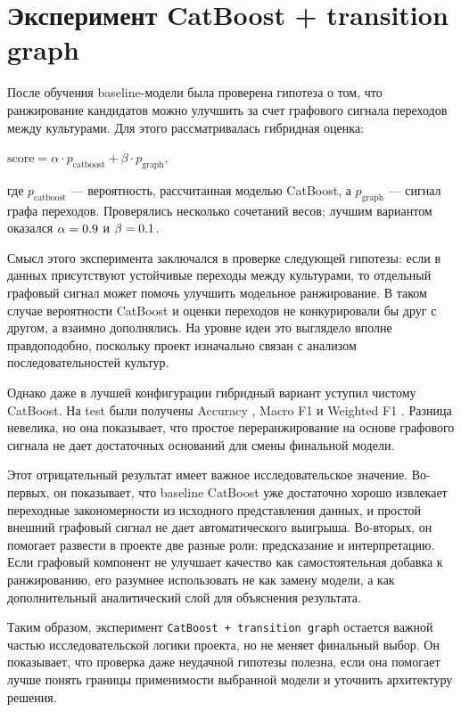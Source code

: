 

\section{Эксперимент CatBoost + transition graph}

После обучения baseline-модели была проверена гипотеза о том, что ранжирование кандидатов можно улучшить за счет графового сигнала переходов между культурами. Для этого рассматривалась гибридная оценка:
\begin{center}
\(
\mathrm{score}=\alpha \cdot p_{\mathrm{catboost}}+\beta \cdot p_{\mathrm{graph}},
\)
\end{center}

где $p_{\mathrm{catboost}}$ --- вероятность, рассчитанная моделью CatBoost, а $p_{\mathrm{graph}}$ --- сигнал графа переходов. Проверялись несколько сочетаний весов; лучшим вариантом оказался $\alpha=0.9$ и $\beta=0.1$.

Смысл этого эксперимента заключался в проверке следующей гипотезы: если в данных присутствуют устойчивые переходы между культурами, то отдельный графовый сигнал может помочь улучшить модельное ранжирование. В таком случае вероятности CatBoost и оценки переходов не конкурировали бы друг с другом, а взаимно дополнялись. На уровне идеи это выглядело вполне правдоподобно, поскольку проект изначально связан с анализом последовательностей культур.

Однако даже в лучшей конфигурации гибридный вариант уступил чистому CatBoost. На test были получены Accuracy \GraphAcc{}, Macro F1 \GraphMacroFOne{} и Weighted F1 \GraphWeightedFOne{}. Разница невелика, но она показывает, что простое переранжирование на основе графового сигнала не дает достаточных оснований для смены финальной модели.

Этот отрицательный результат имеет важное исследовательское значение. Во-первых, он показывает, что baseline CatBoost уже достаточно хорошо извлекает переходные закономерности из исходного представления данных, и простой внешний графовый сигнал не дает автоматического выигрыша. Во-вторых, он помогает развести в проекте две разные роли: предсказание и интерпретацию. Если графовый компонент не улучшает качество как самостоятельная добавка к ранжированию, его разумнее использовать не как замену модели, а как дополнительный аналитический слой для объяснения результата.

Таким образом, эксперимент \texttt{CatBoost + transition graph} остается важной частью исследовательской логики проекта, но не меняет финальный выбор. Он показывает, что проверка даже неудачной гипотезы полезна, если она помогает лучше понять границы применимости выбранной модели и уточнить архитектуру решения.

